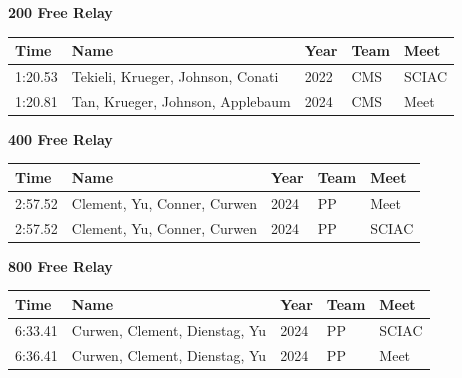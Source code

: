 \vspace{1.2em}
\noindent\begin{minipage}[t]{0.98\textwidth}
\centering
\textbf{\textcolor{teamprimary}{200 Free Relay}}\par
\vspace{0.5em}
\centering
\small
\renewcommand{\arraystretch}{1.0}
\setlength{\tabcolsep}{4pt}
\begin{tabular}{@{}p{2.7cm}p{4.3cm}p{1.6cm}p{2.7cm}p{2.7cm}@{}}
\toprule
\textbf{Time} & \textbf{Name} & \textbf{Year} & \textbf{Team} & \textbf{Meet} \\
\midrule
1:20.53 & Tekieli, Krueger, Johnson, Conati & 2022 & CMS & SCIAC \\
1:20.81 & Tan, Krueger, Johnson, Applebaum & 2024 & CMS & Meet \\
\bottomrule
\end{tabular}
\end{minipage}
\vspace{1.2em}
\noindent\begin{minipage}[t]{0.98\textwidth}
\centering
\textbf{\textcolor{teamprimary}{400 Free Relay}}\par
\vspace{0.5em}
\centering
\small
\renewcommand{\arraystretch}{1.0}
\setlength{\tabcolsep}{4pt}
\begin{tabular}{@{}p{2.7cm}p{4.3cm}p{1.6cm}p{2.7cm}p{2.7cm}@{}}
\toprule
\textbf{Time} & \textbf{Name} & \textbf{Year} & \textbf{Team} & \textbf{Meet} \\
\midrule
2:57.52 & Clement, Yu, Conner, Curwen & 2024 & PP & Meet \\
2:57.52 & Clement, Yu, Conner, Curwen & 2024 & PP & SCIAC \\
\bottomrule
\end{tabular}
\end{minipage}
\vspace{1.2em}
\noindent\begin{minipage}[t]{0.98\textwidth}
\centering
\textbf{\textcolor{teamprimary}{800 Free Relay}}\par
\vspace{0.5em}
\centering
\small
\renewcommand{\arraystretch}{1.0}
\setlength{\tabcolsep}{4pt}
\begin{tabular}{@{}p{2.7cm}p{4.3cm}p{1.6cm}p{2.7cm}p{2.7cm}@{}}
\toprule
\textbf{Time} & \textbf{Name} & \textbf{Year} & \textbf{Team} & \textbf{Meet} \\
\midrule
6:33.41 & Curwen, Clement, Dienstag, Yu & 2024 & PP & SCIAC \\
6:36.41 & Curwen, Clement, Dienstag, Yu & 2024 & PP & Meet \\
\bottomrule
\end{tabular}
\end{minipage}
